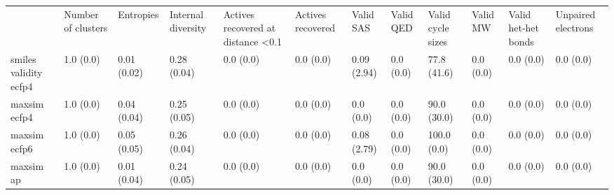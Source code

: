 \begin{tabular}{llllllllllll}
 & Number of clusters & Entropies & Internal diversity & Actives recovered at distance <0.1 & Actives recovered & Valid SAS & Valid QED & Valid cycle sizes & Valid MW & Valid het-het bonds & Unpaired electrons \\
smiles validity ecfp4 & {\cellcolor[HTML]{F6FCFD}} \color[HTML]{000000} 1.0 (0.0) & {\cellcolor[HTML]{F7FCFD}} \color[HTML]{000000} 0.01 (0.02) & {\cellcolor[HTML]{BFE7DE}} \color[HTML]{000000} 0.28 (0.04) & {\cellcolor[HTML]{F7FCFD}} \color[HTML]{000000} 0.0 (0.0) & {\cellcolor[HTML]{F7FCFD}} \color[HTML]{000000} 0.0 (0.0) & {\cellcolor[HTML]{F7FCFD}} \color[HTML]{000000} 0.09 (2.94) & {\cellcolor[HTML]{F7FCFD}} \color[HTML]{000000} 0.0 (0.0) & {\cellcolor[HTML]{1A843F}} \color[HTML]{F1F1F1} 77.8 (41.6) & {\cellcolor[HTML]{F7FCFD}} \color[HTML]{000000} 0.0 (0.0) & {\cellcolor[HTML]{F7FCFD}} \color[HTML]{000000} 0.0 (0.0) & {\cellcolor[HTML]{F7FCFD}} \color[HTML]{000000} 0.0 (0.0) \\
maxsim ecfp4 & {\cellcolor[HTML]{F6FCFD}} \color[HTML]{000000} 1.0 (0.0) & {\cellcolor[HTML]{F7FCFD}} \color[HTML]{000000} 0.04 (0.04) & {\cellcolor[HTML]{CCECE6}} \color[HTML]{000000} 0.25 (0.05) & {\cellcolor[HTML]{F7FCFD}} \color[HTML]{000000} 0.0 (0.0) & {\cellcolor[HTML]{F7FCFD}} \color[HTML]{000000} 0.0 (0.0) & {\cellcolor[HTML]{F7FCFD}} \color[HTML]{000000} 0.0 (0.0) & {\cellcolor[HTML]{F7FCFD}} \color[HTML]{000000} 0.0 (0.0) & {\cellcolor[HTML]{006428}} \color[HTML]{F1F1F1} 90.0 (30.0) & {\cellcolor[HTML]{F7FCFD}} \color[HTML]{000000} 0.0 (0.0) & {\cellcolor[HTML]{F7FCFD}} \color[HTML]{000000} 0.0 (0.0) & {\cellcolor[HTML]{F7FCFD}} \color[HTML]{000000} 0.0 (0.0) \\
maxsim ecfp6 & {\cellcolor[HTML]{F6FCFD}} \color[HTML]{000000} 1.0 (0.0) & {\cellcolor[HTML]{F7FCFD}} \color[HTML]{000000} 0.05 (0.05) & {\cellcolor[HTML]{C7EAE3}} \color[HTML]{000000} 0.26 (0.04) & {\cellcolor[HTML]{F7FCFD}} \color[HTML]{000000} 0.0 (0.0) & {\cellcolor[HTML]{F7FCFD}} \color[HTML]{000000} 0.0 (0.0) & {\cellcolor[HTML]{F7FCFD}} \color[HTML]{000000} 0.08 (2.79) & {\cellcolor[HTML]{F7FCFD}} \color[HTML]{000000} 0.0 (0.0) & {\cellcolor[HTML]{00441B}} \color[HTML]{F1F1F1} 100.0 (0.0) & {\cellcolor[HTML]{F7FCFD}} \color[HTML]{000000} 0.0 (0.0) & {\cellcolor[HTML]{F7FCFD}} \color[HTML]{000000} 0.0 (0.0) & {\cellcolor[HTML]{F7FCFD}} \color[HTML]{000000} 0.0 (0.0) \\
maxsim ap & {\cellcolor[HTML]{F5FBFC}} \color[HTML]{000000} 1.0 (0.0) & {\cellcolor[HTML]{F7FCFD}} \color[HTML]{000000} 0.01 (0.04) & {\cellcolor[HTML]{CFEDE8}} \color[HTML]{000000} 0.24 (0.05) & {\cellcolor[HTML]{F7FCFD}} \color[HTML]{000000} 0.0 (0.0) & {\cellcolor[HTML]{F7FCFD}} \color[HTML]{000000} 0.0 (0.0) & {\cellcolor[HTML]{F7FCFD}} \color[HTML]{000000} 0.0 (0.0) & {\cellcolor[HTML]{F7FCFD}} \color[HTML]{000000} 0.0 (0.0) & {\cellcolor[HTML]{006428}} \color[HTML]{F1F1F1} 90.0 (30.0) & {\cellcolor[HTML]{F7FCFD}} \color[HTML]{000000} 0.0 (0.0) & {\cellcolor[HTML]{F7FCFD}} \color[HTML]{000000} 0.0 (0.0) & {\cellcolor[HTML]{F7FCFD}} \color[HTML]{000000} 0.0 (0.0) \\

\end{tabular}
